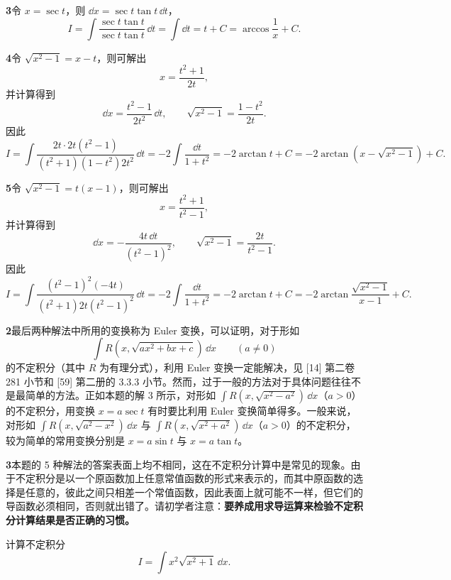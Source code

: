 \begin{xsolution}
\textbf{3}\quad 令 $x=\sec t$，则 $\dd x=\sec t\tan t\,\dd t$，
\[
  I=\int\frac{\sec t\tan t}{\sec t\tan t}\,\dd t
   =\int\dd t=t+C=\arccos\frac1x+C.
\]
\end{xsolution}

\begin{xsolution}
\textbf{4}\quad 令 $\sqrt{x^2-1}=x-t$，则可解出
\[
  x=\frac{t^2+1}{2t},
\]
并计算得到
\[
  \dd x=\frac{t^2-1}{2t^2}\,\dd t,
  \qquad
  \sqrt{x^2-1}=\frac{1-t^2}{2t}.
\]
因此
\[
  I=\int\frac{2t\cdot2t(t^2-1)}{(t^2+1)(1-t^2)2t^2}\,\dd t
   =-2\int\frac{\dd t}{1+t^2}
   =-2\arctan t+C
   =-2\arctan\left(x-\sqrt{x^2-1}\right)+C.
\]
\end{xsolution}

\begin{xsolution}
\textbf{5}\quad 令 $\sqrt{x^2-1}=t(x-1)$，则可解出
\[
  x=\frac{t^2+1}{t^2-1},
\]
并计算得到
\[
  \dd x=-\frac{4t\,\dd t}{(t^2-1)^2},
  \qquad
  \sqrt{x^2-1}=\frac{2t}{t^2-1}.
\]
因此
\[
  I=\int\frac{(t^2-1)^2(-4t)}{(t^2+1)2t(t^2-1)^2}\,\dd t
   =-2\int\frac{\dd t}{1+t^2}
   =-2\arctan t+C
   =-2\arctan\frac{\sqrt{x^2-1}}{x-1}+C.
\]
\end{xsolution}

\begin{xremark}
\textbf{2}\quad 最后两种解法中所用的变换称为 Euler 变换，可以证明，对于形如
\[
  \int R\left(x,\sqrt{ax^2+bx+c}\right)\,\dd x\qquad(a\ne0)
\]
的不定积分（其中 $R$ 为有理分式），利用 Euler 变换一定能解决，见 [14] 第二卷 281 小节和 [59] 第二册的 3.3.3 小节。然而，过于一般的方法对于具体问题往往不是最简单的方法。正如本题的解 3 所示，对形如 $\int R(x,\sqrt{x^2-a^2})\,\dd x$（$a>0$）的不定积分，用变换 $x=a\sec t$ 有时要比利用 Euler 变换简单得多。一般来说，对形如 $\int R(x,\sqrt{a^2-x^2})\,\dd x$ 与 $\int R(x,\sqrt{x^2+a^2})\,\dd x$（$a>0$）的不定积分，较为简单的常用变换分别是 $x=a\sin t$ 与 $x=a\tan t$。
\end{xremark}

\begin{xremark}
\textbf{3}\quad 本题的 5 种解法的答案表面上均不相同，这在不定积分计算中是常见的现象。由于不定积分是以一个原函数加上任意常值函数的形式来表示的，而其中原函数的选择是任意的，彼此之间只相差一个常值函数，因此表面上就可能不一样，但它们的导函数必须相同，否则就出错了。请初学者注意：\textbf{要养成用求导运算来检验不定积分计算结果是否正确的习惯。}
\end{xremark}

\begin{xexample}[9.1.2]
计算不定积分
\[
  I=\int x^2\sqrt{x^2+1}\,\dd x.
\]
\end{xexample}

